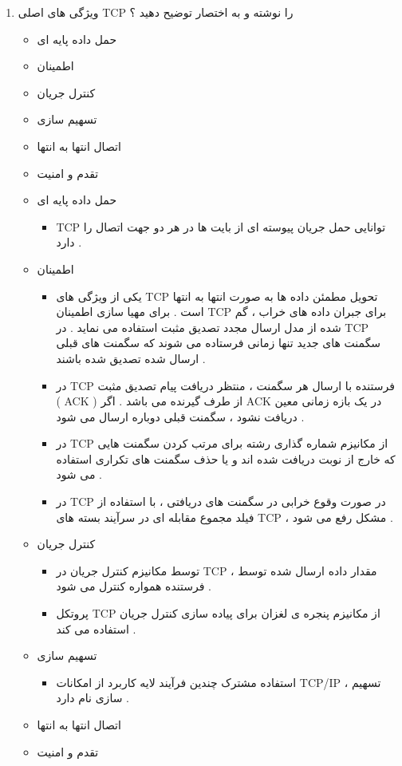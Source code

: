 \documentclass{article}
\begin{document}
\begin{enumerate}
\item ویژگی های اصلی TCP را نوشته و به اختصار توضیح دهید ؟

\begin{tcolorbox}
\begin{itemize}
	\item حمل داده پایه ای
	\item اطمینان
	\item کنترل جریان
	\item تسهیم سازی
	\item اتصال انتها به انتها
	\item تقدم و امنیت
\end{itemize}
\end{tcolorbox}


\begin{tcolorbox}
\begin{itemize}
	\item حمل داده پایه ای
	\begin{itemize}
		\item TCP توانایی حمل جریان پیوسته ای از بایت ها در هر دو جهت اتصال را دارد .
	\end{itemize}
	\item اطمینان
	\begin{itemize}
		\item یکی از ویژگی های TCP تحویل مطمئن داده ها
		به صورت انتها به انتها است . برای مهیا سازی اطمینان TCP برای جبران داده های خراب ، گم شده از مدل ارسال مجدد تصدیق مثبت استفاده می نماید . در TCP سگمنت های جدید تنها زمانی فرستاده می شوند که سگمنت های قبلی ارسال شده تصدیق شده باشند . 
		\item در TCP 
		فرستنده با ارسال هر سگمنت ، منتظر دریافت پیام تصدیق مثبت ( ACK ) از طرف گیرنده می باشد . اگر ACK
		در یک بازه زمانی معین دریافت نشود ، سگمنت قبلی دوباره ارسال می شود .
		\item در TCP
		از مکانیزم شماره گذاری رشته برای مرتب کردن سگمنت هایی که خارج از نوبت دریافت شده اند و یا حذف سگمنت های تکراری استفاده می شود .
		\item در TCP
		در صورت وقوع خرابی در سگمنت های دریافتی ، با استفاده از فیلد مجموع مقابله ای در سرآیند بسته های TCP 
		، مشکل رفع می شود .
	\end{itemize}
	\item کنترل جریان
	\begin{itemize}
		\item توسط مکانیزم کنترل جریان در TCP
		، مقدار داده ارسال شده توسط فرستنده همواره کنترل می شود .
		\item پروتکل TCP از مکانیزم پنجره ی لغزان
		برای پیاده سازی کنترل جریان استفاده می کند .
	\end{itemize}
	\item تسهیم سازی
	\begin{itemize}
		\item استفاده مشترک چندین فرآیند لایه کاربرد از امکانات TCP/IP ، 
		تسهیم سازی نام دارد .
	\end{itemize}
	\item اتصال انتها به انتها
	\item تقدم و امنیت
\end{itemize}
\end{tcolorbox}



\end{enumerate}
\end{document}
